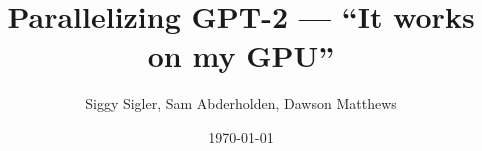 \documentclass[10pt]{article}
\title{Parallelizing GPT-2 --- ``It works on my GPU''}
\author{Siggy Sigler, Sam Abderholden, Dawson Matthews}
\date{\today}
\begin{document}
\maketitle








\clearpage
\appendix


\clearpage
\nocite{karpathyMicrogpt2026,radfordLanguageModelsAre2019}


\end{document}

